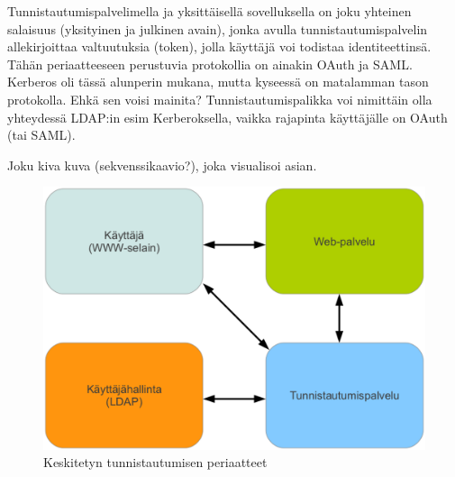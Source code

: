 Tunnistautumispalvelimella ja yksittäisellä sovelluksella on joku yhteinen salaisuus (yksityinen ja julkinen avain), jonka avulla tunnistautumispalvelin allekirjoittaa valtuutuksia (token), jolla käyttäjä voi todistaa identiteettinsä. Tähän periaatteeseen perustuvia protokollia on ainakin OAuth ja SAML. Kerberos oli tässä alunperin mukana, mutta kyseessä on matalamman tason protokolla. Ehkä sen voisi mainita? Tunnistautumispalikka voi nimittäin olla yhteydessä LDAP:in esim Kerberoksella, vaikka rajapinta käyttäjälle on OAuth (tai SAML).

Joku kiva kuva (sekvenssikaavio?), joka visualisoi asian.

\begin{figure}[ht]
\centering
\includegraphics[width=\textwidth]{teknologiat/composition.eps}
\caption{Keskitetyn tunnistautumisen periaatteet}%
\label{composition}
\end{figure}
